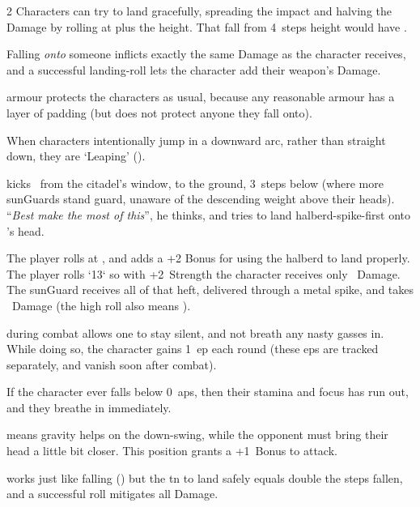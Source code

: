 \begin{multicols}{2}
Characters can try to land gracefully, spreading the impact and halving the Damage by rolling  at \tn[7] plus the height.
That fall from 4~\glspl{step} height would have \tn[11].

Falling \emph{onto} someone inflicts exactly the same Damage as the character receives, and a successful landing-roll lets the character add their weapon's Damage.

\Gls{armour} protects the characters as usual, because any reasonable armour has a layer of padding (but does not protect anyone they fall onto).

When characters intentionally jump in a downward arc, rather than straight down, they are `Leaping' ().

\begin{exampletext}
   kicks \composeHumanName\ from the citadel's window, to the ground, 3~\glspl{step} below (where more \glspl{sunGuard} stand guard, unaware of the descending weight above their heads).
  ``\textit{Best make the most of this}'', he thinks, and tries to land halberd-spike-first onto 's head.

  \sffamily
  The player rolls  at \tn[10], and adds a +2 Bonus for using the halberd to land properly.
  The player rolls `13` so with +2~Strength the character receives only ~Damage.
  The \gls{sunGuard} receives all of that heft, delivered through a metal spike, and takes ~Damage (the high roll also means ).
\end{exampletext}

during combat allows one to stay silent, and not breath any nasty gasses in.
While doing so, the character gains 1~\gls{ep} each round (these \glspl{ep} are tracked separately, and vanish soon after combat).

If the character ever falls below 0~\glspl{ap}, then their stamina and focus has run out, and they breathe in immediately.

means gravity helps on the down-swing, while the opponent must bring their head a little bit closer.
This position grants a +1~Bonus to attack.

works just like falling () but the \gls{tn} to land safely equals double the \glspl{step} fallen, and a successful roll mitigates all Damage.


\end{multicols}
